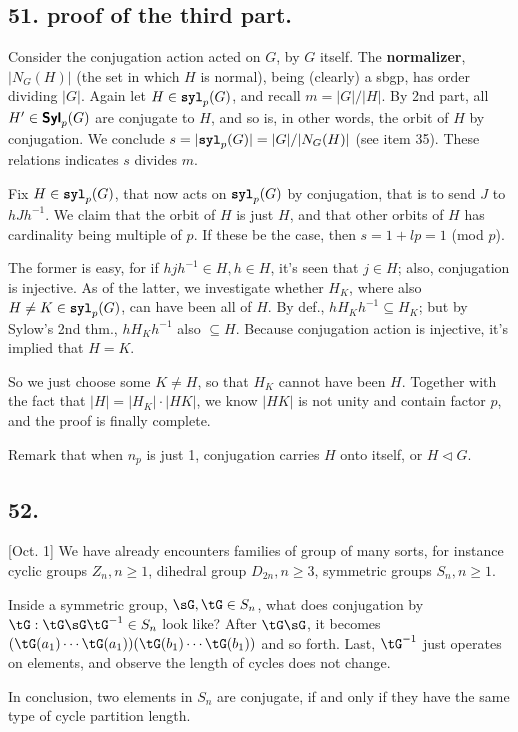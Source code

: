 \documentclass[12pt]{article}
\newcommand\M\cdot%
\newcommand{\Ss}[1]{\textsf{\textbf{#1}}}%
\newcommand{\Tw}[1]{\texttt{\textbf{#1}}}%
\begin{document}
\subsection*{51. proof of the third part.} Consider the conjugation action acted on \(G\), by \(G\) itself. 
The \Ss{normalizer}, \(|N_G(H)|\) (the set in which \(H\) is normal), being (clearly) a sbgp, has order dividing \(|G|\). 
Again let \(H \in \Tw{syl}_p(G)\), 
and recall \(m= |G|/|H|\). 
By 2nd part, all \(H' \in \Ss{Syl}_p(G)\) are conjugate to \(H\), and so is, in other words, the orbit of \(H\) by conjugation. 
We conclude \(s= |\Tw{syl}_p(G)|= |G| / |N_G(H)|\) (see item 35). 
These relations indicates \(s\) divides \(m\). \par
Fix \(H \in \Tw{syl}_p(G)\), that now acts on \(\Tw{syl}_p(G)\) by conjugation, that is to send \(J\) to \(hJh^{-1}\). 
We claim that the orbit of \(H\) is just \(H\), 
and that other orbits of \(H\) has cardinality being multiple of \(p\). 
If these be the case, then \(s = 1 + lp = 1\) (mod \(p\)). \par
The former is easy, for if \(hjh^{-1} \in H, h \in H\), it's seen that \(j \in H\); also, conjugation is injective. 
As of the latter, we investigate whether \(H_K\), where also \(H \neq K \in \Tw{syl}_p(G)\), can have been all of \(H\). 
By def., \(h H_K h^{-1} \subseteq H_K\); 
but by Sylow's 2nd thm., \(h H_K h^{-1}\) also \(\subseteq H\). 
Because conjugation action is injective, it's implied that \(H=K\). \par
So we just choose some \(K \neq H\), 
so that \(H_K\) cannot have been \(H\). 
Together with the fact that \(|H|= |H_K| \M |HK|\), 
we know \(|HK|\) is not unity and contain factor \(p\), 
and the proof is finally complete. \par
Remark that when \(n_p\) is just 1, conjugation carries \(H\) onto itself, or \(H \lhd G\). 

\subsection*{52.} [Oct. 1] We have already encounters families of group of many sorts, for instance cyclic groups \(Z_n, n \geq 1\), 
dihedral group \(D_{2n}, n \geq 3\), symmetric groups \(S_n, n \geq 1\). \par
Inside a symmetric group, \( \sG, \tG \in S_n \), what does conjugation by \( \tG: \tG \sG \tG^{-1} \in S_n \) look like?
After \(\tG\sG\), it becomes \( (\tG(a_1) \dotsb \tG(a_1)) (\tG(b_1) \dotsb \tG(b_1)) \) and so forth.
Last, \(\tG^{-1}\) just operates on elements, and observe the length of cycles does not change. \par
In conclusion, two elements in \(S_n\) are conjugate, if and only if they have the same type of cycle partition length. \par
\end{document}
